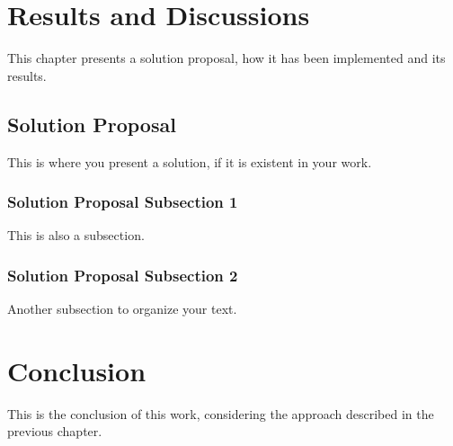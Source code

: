 \chapter[Results and Discussions]{Results and Discussions}
This chapter presents a solution proposal, how it has been implemented and its results.
\section{Solution Proposal}
This is where you present a solution, if it is existent in your work.

\subsection{Solution Proposal Subsection 1}
This is also a subsection.

\subsection{Solution Proposal Subsection 2}
Another subsection to organize your text.

\chapter{Conclusion}
This is the conclusion of this work, considering the approach described in the previous chapter.